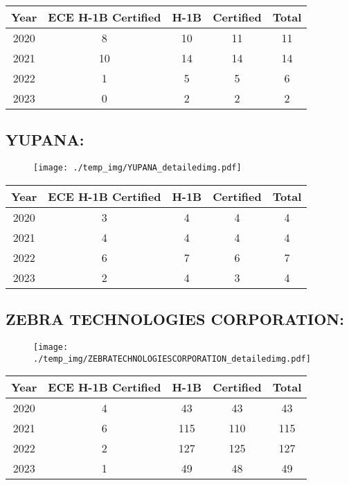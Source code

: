\documentclass{article}%
\begin{document}
%
\begin{longtable}{c|c|c|c|c}%
\hline%
Year&ECE H{-}1B Certified&H{-}1B&Certified&Total\\%
\hline%
2020&8&10&11&11\\%
\hline%
2021&10&14&14&14\\%
\hline%
2022&1&5&5&6\\%
\hline%
2023&0&2&2&2\\%
\hline%
\end{longtable}

%
\newpage%
\subsection{YUPANA:}%
\label{subsec:YUPANA}%
\label{YUPANAdetailed}%


\begin{figure}[htbp]%
\centering%
\texttt{[image: ./temp\_img/YUPANA\_detailedimg.pdf]}%
\end{figure}

%
\begin{longtable}{c|c|c|c|c}%
\hline%
Year&ECE H{-}1B Certified&H{-}1B&Certified&Total\\%
\hline%
2020&3&4&4&4\\%
\hline%
2021&4&4&4&4\\%
\hline%
2022&6&7&6&7\\%
\hline%
2023&2&4&3&4\\%
\hline%
\end{longtable}

%
\newpage%
\subsection{ZEBRA TECHNOLOGIES CORPORATION:}%
\label{subsec:ZEBRATECHNOLOGIESCORPORATION}%
\label{ZEBRATECHNOLOGIESCORPORATIONdetailed}%


\begin{figure}[htbp]%
\centering%
\texttt{[image: ./temp\_img/ZEBRATECHNOLOGIESCORPORATION\_detailedimg.pdf]}%
\end{figure}

%
\begin{longtable}{c|c|c|c|c}%
\hline%
Year&ECE H{-}1B Certified&H{-}1B&Certified&Total\\%
\hline%
2020&4&43&43&43\\%
\hline%
2021&6&115&110&115\\%
\hline%
2022&2&127&125&127\\%
\hline%
2023&1&49&48&49\\%
\hline%
\end{longtable}
\end{document}
